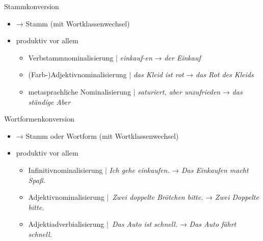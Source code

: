 \begin{frame}
  {Stammkonversion}
  \pause
  \begin{itemize}[<+->]
    \item {} → Stamm \alert{(mit Wortklassenwechsel)}
      \Halbzeile
    \item produktiv vor allem 
      \Halbzeile
      \begin{itemize}[<+->]
        \item \alert{Verbstammnominalisierung} | \textit{\alert{einkauf-en}} → \textit{der \alert{Einkauf}}\\
          \Halbzeile

        \item \alert{(Farb-)Adjektivnominalisierung} | \textit{das Kleid ist \alert{rot}} → \textit{das \alert{Rot} des Kleids}\\
          \Halbzeile

        \item \alert{metasprachliche Nominalisierung} | \textit{saturiert, \alert{aber} unzufrieden} → \textit{das ständige \alert{Aber}}\\

      \end{itemize}
  \end{itemize}
\end{frame}

\begin{frame}
  {Wortformenkonversion}
  \pause
  \begin{itemize}[<+->]
    \item {} → Stamm \alert{oder} Wortform \alert{(mit Wortklassenwechsel)}
      \Halbzeile
    \item produktiv vor allem
      \Halbzeile
      \begin{itemize}[<+->]
        \item \alert{Infinitivnominalisierung} | \textit{Ich gehe \alert{einkaufen}.} → \textit{Das \alert{Einkaufen} macht Spaß.}\\
          \Halbzeile

        \item \alert{Adjektivnominalisierung} | \textit{Zwei \alert{doppelte} Brötchen bitte.} → \textit{Zwei \alert{Doppelte} bitte.}\\
          \Halbzeile

        \item \alert{Adjektiadverbialisierung} | \textit{Das Auto ist \alert{schnell}.} → \textit{Das Auto fährt \alert{schnell}.}\\
      \end{itemize}
  \end{itemize}
\end{frame}

